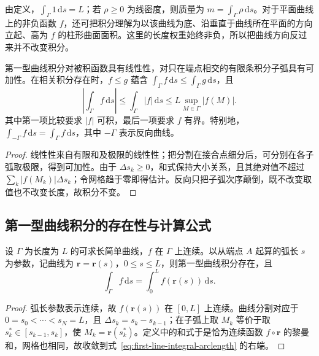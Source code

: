 由定义，$\int_\Gamma1\,\mathrm ds=L$；若 $\rho\geq0$ 为线密度，则质量为 $m=\int_\Gamma\rho\,\mathrm ds$。对于平面曲线上的非负函数 $f$，还可把积分理解为以该曲线为底、沿垂直于曲线所在平面的方向立起、高为 $f$ 的柱形曲面面积。这里的长度权重始终非负，所以把曲线方向反过来并不改变积分。

\begin{proposition}
\label{prop:first-line-integral-properties}
第一型曲线积分对被积函数具有线性性，对只在端点相交的有限条积分子弧具有可加性。在相关积分存在时，$f\leq g$ 蕴含 $\int_\Gamma f\,\mathrm ds\leq\int_\Gamma g\,\mathrm ds$，且
\[
    \left|\int_\Gamma f\,\mathrm ds\right|
    \leq\int_\Gamma|f|\,\mathrm ds
    \leq L\sup_{M\in\Gamma}|f(M)|.
\]
其中第一项比较要求 $|f|$ 可积，最后一项要求 $f$ 有界。特别地，$\int_{-\Gamma}f\,\mathrm ds=\int_\Gamma f\,\mathrm ds$，其中 $-\Gamma$ 表示反向曲线。
\end{proposition}

\begin{proof}
线性性来自有限和及极限的线性性；把分割在接合点细分后，可分别在各子弧取极限，得到可加性。由于 $\Delta s_k\geq0$，和式保持大小关系，且其绝对值不超过 $\sum_k|f(M_k)|\Delta s_k$；令网格趋于零即得估计。反向只把子弧次序颠倒，既不改变取值也不改变长度，故积分不变。
\end{proof}

\subsection{第一型曲线积分的存在性与计算公式}
\label{subsec:existence-and-evaluation-of-line-integrals-of-the-first-kind}

\begin{theorem}
\label{thm:first-line-integral-arclength}
设 $\Gamma$ 为长度为 $L$ 的可求长简单曲线，$f$ 在 $\Gamma$ 上连续。以从端点 $A$ 起算的弧长 $s$ 为参数，记曲线为 $\boldsymbol r=\boldsymbol r(s)$，$0\leq s\leq L$，则第一型曲线积分存在，且
\begin{equation}
\label{eq:first-line-integral-arclength}
    \int_\Gamma f\,\mathrm ds=\int_0^L f(\boldsymbol r(s))\,\mathrm ds.
\end{equation}
\end{theorem}

\begin{proof}
弧长参数表示连续，故 $f(\boldsymbol r(s))$ 在 $[0,L]$ 上连续。曲线分割对应于 $0=s_0<\cdots<s_N=L$，且 $\Delta s_k=s_k-s_{k-1}$；在子弧上取 $M_k$ 等价于取 $s_k^*\in[s_{k-1},s_k]$，使 $M_k=\boldsymbol r(s_k^*)$。定义中的和式于是恰为连续函数 $f\circ\boldsymbol r$ 的黎曼和，网格也相同，故收敛到式~\eqref{eq:first-line-integral-arclength} 的右端。
\end{proof}

